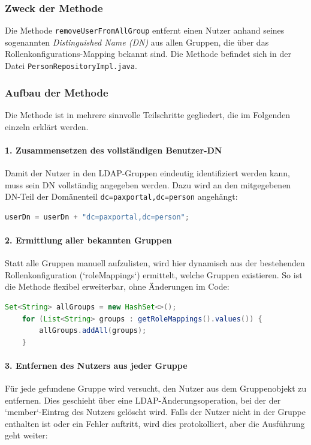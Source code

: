 \subsubsection*{Zweck der Methode}
Die Methode \texttt{removeUserFromAllGroup} entfernt einen Nutzer anhand seines sogenannten \textit{Distinguished Name (DN)} aus allen Gruppen, die über das Rollenkonfigurations-Mapping bekannt sind. Die Methode befindet sich in der Datei \texttt{PersonRepositoryImpl.java}.

\subsubsection*{Aufbau der Methode}
Die Methode ist in mehrere sinnvolle Teilschritte gegliedert, die im Folgenden einzeln erklärt werden.

\paragraph{1. Zusammensetzen des vollständigen Benutzer-DN}
Damit der Nutzer in den LDAP-Gruppen eindeutig identifiziert werden kann, muss sein DN vollständig angegeben werden. Dazu wird an den mitgegebenen DN-Teil der Domänenteil \texttt{dc=paxportal,dc=person} angehängt:

\begin{lstlisting}[language=Java, caption={Konstruktion des vollständigen Benutzer-DN}]
userDn = userDn + "dc=paxportal,dc=person";
\end{lstlisting}

\paragraph{2. Ermittlung aller bekannten Gruppen}
Statt alle Gruppen manuell aufzulisten, wird hier dynamisch aus der bestehenden Rollenkonfiguration (`roleMappings`) ermittelt, welche Gruppen existieren. So ist die Methode flexibel erweiterbar, ohne Änderungen im Code:

\begin{lstlisting}[language=Java, caption={Dynamisches Sammeln aller Zielgruppen}]
    Set<String> allGroups = new HashSet<>();
    for (List<String> groups : getRoleMappings().values()) {
        allGroups.addAll(groups);
    }
\end{lstlisting}

\paragraph{3. Entfernen des Nutzers aus jeder Gruppe}
Für jede gefundene Gruppe wird versucht, den Nutzer aus dem Gruppenobjekt zu entfernen. Dies geschieht über eine LDAP-Änderungsoperation, bei der der `member`-Eintrag des Nutzers gelöscht wird. Falls der Nutzer nicht in der Gruppe enthalten ist oder ein Fehler auftritt, wird dies protokolliert, aber die Ausführung geht weiter:

